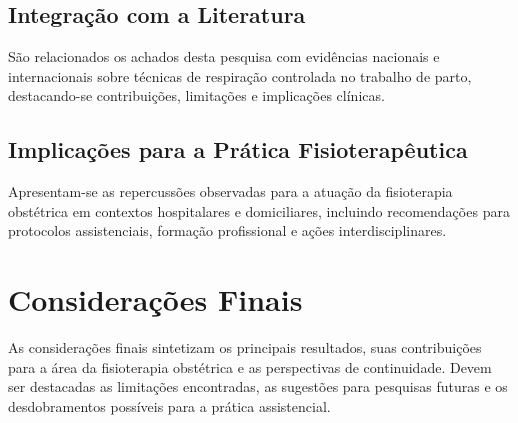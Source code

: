 \documentclass[openright]{tex/estilos/normas-utf-tex}
\begin{document}
\section{Integração com a Literatura}
\label{sec:integracao-literatura}

São relacionados os achados desta pesquisa com evidências nacionais e internacionais sobre técnicas de respiração controlada no trabalho de parto, destacando-se contribuições, limitações e implicações clínicas.

\section{Implicações para a Prática Fisioterapêutica}
\label{sec:implicacoes-pratica}

Apresentam-se as repercussões observadas para a atuação da fisioterapia obstétrica em contextos hospitalares e domiciliares, incluindo recomendações para protocolos assistenciais, formação profissional e ações interdisciplinares.

\chapter{Considerações Finais}
\label{chap:consideracoes-finais}

As considerações finais sintetizam os principais resultados, suas contribuições para a área da fisioterapia obstétrica e as perspectivas de continuidade. Devem ser destacadas as limitações encontradas, as sugestões para pesquisas futuras e os desdobramentos possíveis para a prática assistencial.

\clearpage %
\label{bibstart}


\label{bibend}
\end{document}
